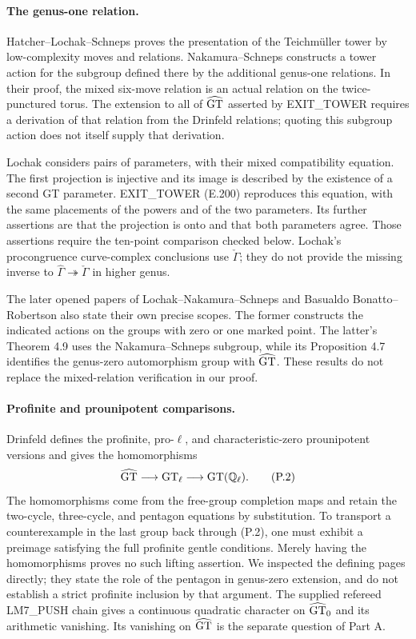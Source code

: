 \paragraph{The genus-one relation.}
Hatcher--Lochak--Schneps \cite{ET_HLS2000} proves the presentation of the Teichm\"uller tower by low-complexity moves and relations. Nakamura--Schneps \cite[Definition 1.1, Theorems 1.2--1.4, and Sections 7--9]{CA_NS2000} constructs a tower action for the subgroup defined there by the additional genus-one relations. In their proof, the mixed six-move relation is an actual relation on the twice-punctured torus. The extension to all of $\widehat{\mathrm{GT}}$ asserted by EXIT\_TOWER requires a derivation of that relation from the Drinfeld relations; quoting this subgroup action does not itself supply that derivation.

Lochak \cite[Definition 5.4 through Proposition 5.9]{Lochak2025Aut} considers pairs of parameters, with their mixed compatibility equation. The first projection is injective and its image is described by the existence of a second GT parameter. EXIT\_TOWER (E.200) reproduces this equation, with the same placements of the powers and of the two parameters. Its further assertions are that the projection is onto and that both parameters agree. Those assertions require the ten-point comparison checked below. Lochak's procongruence curve-complex conclusions use $\check\Gamma$; they do not provide the missing inverse to $\widehat\Gamma\twoheadrightarrow\check\Gamma$ in higher genus.

The later opened papers of Lochak--Nakamura--Schneps \cite{LNS2026} and Basualdo Bonatto--Robertson \cite{ET_BonattoRobertson2026} also state their own precise scopes. The former constructs the indicated actions on the groups with zero or one marked point. The latter's Theorem 4.9 uses the Nakamura--Schneps subgroup, while its Proposition 4.7 identifies the genus-zero automorphism group with $\widehat{\mathrm{GT}}$. These results do not replace the mixed-relation verification in our proof.

\paragraph{Profinite and prounipotent comparisons.}
Drinfeld \cite[Section 4, printed pp.~844--847]{Drinfeld1991} defines the profinite, pro-$\ell$, and characteristic-zero prounipotent versions and gives the homomorphisms
\[
 \widehat{\mathrm{GT}}\longrightarrow\mathrm{GT}_{\ell}
       \longrightarrow\mathrm{GT}(\mathbb Q_\ell).
 \tag{P.2}
\]
The homomorphisms come from the free-group completion maps and retain the two-cycle, three-cycle, and pentagon equations by substitution. To transport a counterexample in the last group back through (P.2), one must exhibit a preimage satisfying the full profinite gentle conditions. Merely having the homomorphisms proves no such lifting assertion. We inspected the defining pages directly; they state the role of the pentagon in genus-zero extension, and do not establish a strict profinite inclusion by that argument. The supplied refereed LM7\_PUSH chain gives a continuous quadratic character on $\widehat{\mathrm{GT}}_0$ and its arithmetic vanishing. Its vanishing on $\widehat{\mathrm{GT}}$ is the separate question of Part A.

